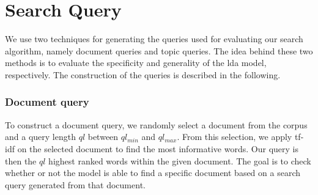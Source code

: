 \section{Search Query}\label{sec:query}

We use two techniques for generating the queries used for evaluating our search algorithm, namely document queries and topic queries.
The idea behind these two methods is to evaluate the specificity and generality of the \gls{lda} model, respectively.
The construction of the queries is described in the following.

\subsubsection{Document query}\label{subsec:query_gen_doc}
To construct a document query, we randomly select a document from the corpus and a query length $ql$ between $ql_{min}$ and $ql_{max}$.
From this selection, we apply \gls{tf-idf} on the selected document to find the most informative words.
Our query is then the $ql$ highest ranked words within the given document.
The goal is to check whether or not the model is able to find a specific document based on a search query generated from that document.


